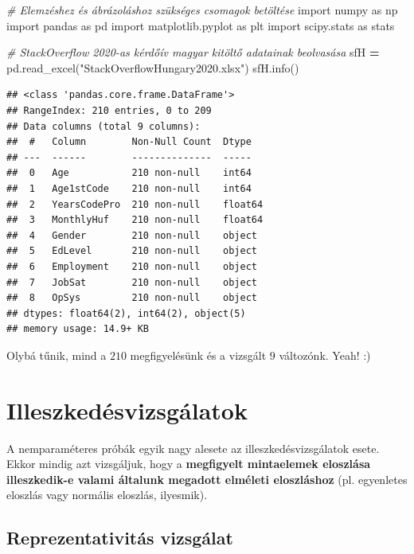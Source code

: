 \documentclass[
]{book}
\newenvironment{Shaded}{\begin{snugshade}}{\end{snugshade}}
\newcommand{\CommentTok}[1]{\textcolor[rgb]{0.56,0.35,0.01}{\textit{#1}}}
\newcommand{\ImportTok}[1]{#1}
\newcommand{\NormalTok}[1]{#1}
\newcommand{\OperatorTok}[1]{\textcolor[rgb]{0.81,0.36,0.00}{\textbf{#1}}}
\newcommand{\StringTok}[1]{\textcolor[rgb]{0.31,0.60,0.02}{#1}}
\begin{document}
\begin{Shaded}
\begin{Highlighting}[]
\CommentTok{\# Elemzéshez és ábrázoláshoz szükséges csomagok betöltése}
\ImportTok{import}\NormalTok{ numpy }\ImportTok{as}\NormalTok{ np}
\ImportTok{import}\NormalTok{ pandas }\ImportTok{as}\NormalTok{ pd}
\ImportTok{import}\NormalTok{ matplotlib.pyplot }\ImportTok{as}\NormalTok{ plt}
\ImportTok{import}\NormalTok{ scipy.stats }\ImportTok{as}\NormalTok{ stats}

\CommentTok{\# StackOverflow 2020{-}as kérdőív magyar kitöltő adatainak beolvasása}
\NormalTok{sfH }\OperatorTok{=}\NormalTok{ pd.read\_excel(}\StringTok{"StackOverflowHungary2020.xlsx"}\NormalTok{)}
\NormalTok{sfH.info()}
\end{Highlighting}
\end{Shaded}

\begin{verbatim}
## <class 'pandas.core.frame.DataFrame'>
## RangeIndex: 210 entries, 0 to 209
## Data columns (total 9 columns):
##  #   Column        Non-Null Count  Dtype  
## ---  ------        --------------  -----  
##  0   Age           210 non-null    int64  
##  1   Age1stCode    210 non-null    int64  
##  2   YearsCodePro  210 non-null    float64
##  3   MonthlyHuf    210 non-null    float64
##  4   Gender        210 non-null    object 
##  5   EdLevel       210 non-null    object 
##  6   Employment    210 non-null    object 
##  7   JobSat        210 non-null    object 
##  8   OpSys         210 non-null    object 
## dtypes: float64(2), int64(2), object(5)
## memory usage: 14.9+ KB
\end{verbatim}

Olybá tűnik, mind a \(210\) megfigyelésünk és a vizsgált \(9\) változónk. Yeah! :)

\section{Illeszkedésvizsgálatok}\label{illeszkeduxe9svizsguxe1latok}

A nemparaméteres próbák egyik nagy alesete az illeszkedésvizsgálatok esete. Ekkor mindig azt vizsgáljuk, hogy a \textbf{megfigyelt mintaelemek eloszlása illeszkedik-e valami általunk megadott elméleti eloszláshoz} (pl. egyenletes eloszlás vagy normális eloszlás, ilyesmik).

\subsection{Reprezentativitás vizsgálat}\label{reprezentativituxe1s-vizsguxe1lat}
\end{document}
